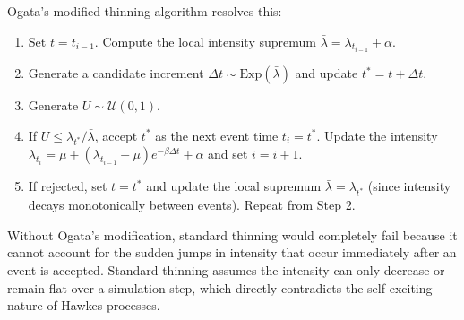 \documentclass[11pt,a4paper]{article}
\begin{document}
Ogata's modified thinning algorithm resolves this:
\begin{enumerate}
    \item Set $t = t_{i-1}$. Compute the local intensity supremum $\bar{\lambda} = \lambda_{t_{i-1}} + \alpha$.
    \item Generate a candidate increment $\Delta t \sim \text{Exp}(\bar{\lambda})$ and update $t^* = t + \Delta t$.
    \item Generate $U \sim \mathcal{U}(0, 1)$.
    \item If $U \leq \lambda_{t^*}/\bar{\lambda}$, accept $t^*$ as the next event time $t_i = t^*$. Update the intensity $\lambda_{t_i} = \mu + (\lambda_{t_{i-1}} - \mu) e^{-\beta \Delta t} + \alpha$ and set $i = i+1$.
    \item If rejected, set $t = t^*$ and update the local supremum $\bar{\lambda} = \lambda_{t^*}$ (since intensity decays monotonically between events). Repeat from Step 2.
\end{enumerate}

Without Ogata's modification, standard thinning would completely fail because it cannot account for the sudden jumps in intensity that occur immediately after an event is accepted. Standard thinning assumes the intensity can only decrease or remain flat over a simulation step, which directly contradicts the self-exciting nature of Hawkes processes.
\end{document}
